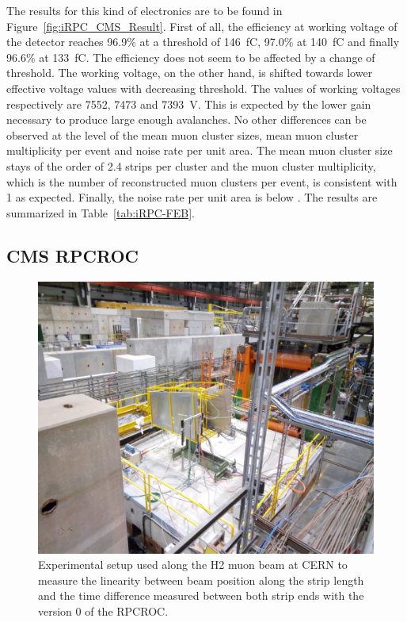     The results for this kind of electronics are to be found in Figure~\ref{fig:iRPC_CMS_Result}. First of all, the efficiency at working voltage of the detector reaches 96.9\% at a threshold of \SI{146}{fC}, 97.0\% at \SI{140}{fC} and finally 96.6\% at \SI{133}{fC}. The efficiency does not seem to be affected by a change of threshold. The working voltage, on the other hand, is shifted towards lower effective voltage values with decreasing threshold. The values of working voltages respectively are 7552, 7473 and \SI{7393}{V}. This is expected by the lower gain necessary to produce large enough avalanches. No other differences can be observed at the level of the mean muon cluster sizes, mean muon cluster multiplicity per event and noise rate per unit area. The mean muon cluster size stays of the order of 2.4 strips per cluster and the muon cluster multiplicity, which is the number of reconstructed muon clusters per event, is consistent with 1 as expected. Finally, the noise rate per unit area is below . The results are summarized in Table~\ref{tab:iRPC-FEB}.
	
		\subsection{CMS RPCROC}
		\label{chapt6:ssec:RPCROCcert}

\begingroup\setlength{\intextsep}{0pt}\setlength{\columnsep}{15pt}
	
	\begin{figure}
		\centering
		\includegraphics[width = 0.9\linewidth]{fig/chapt6/iRPC-RPCROC-H2.png}
		\caption{\label{fig:RPCROCv0_H2} Experimental setup used along the H2 muon beam at CERN to measure the linearity between beam position along the strip length and the time difference measured between both strip ends with the version 0 of the RPCROC.}
    \end{figure}
		
